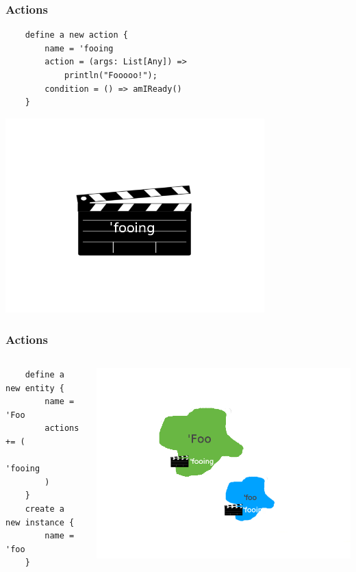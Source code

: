 \documentclass{beamer}
\begin{document}
\begin{frame}[fragile]
    \frametitle{Actions}
    \begin{lstlisting}
    define a new action {
        name = 'fooing
        action = (args: List[Any]) =>
            println("Fooooo!");
        condition = () => amIReady()
    }
    \end{lstlisting}
    \includegraphics[width=10cm]{fooing}
\end{frame}

\begin{frame}[fragile]
    \frametitle{Actions}
    \begin{columns}[T]
    \begin{column}[T]{5.5cm}
    \begin{lstlisting}
    define a new entity {
        name = 'Foo
        actions += (
            'fooing
        )
    }
    create a new instance {
        name = 'foo
    }
    \end{lstlisting}
    \end{column}
    \begin{column}[T]{4cm}
    \includegraphics[scale=0.4, trim=8cm 0cm 8cm 0cm]{foo-fooing}
    \end{column}
    \end{columns}
\end{frame}
\end{document}
